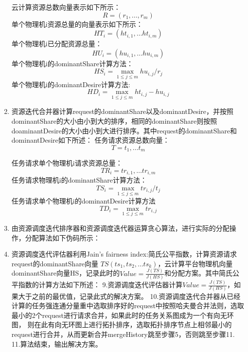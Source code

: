 \begin{enumerate}
云计算资源总数向量表示如下所示：
\begin{equation}
R=\left({r}_{1},…,{r}_{m}\right)
\end{equation}
单个物理机i资源总量的向量表示如下所示：
\begin{equation}
{HT}_{i}=\left({ht}_{i,1},…{ht}_{i,m} \right)
\end{equation}
单个物理机i已分配资源总量：
\begin{equation}
{HU}_{i}=\left({hu}_{i,1},…{hu}_{i,m}\right)
\end{equation}
单个物理机i的dominantShare计算方法：
\begin{equation}
{HS}_{i} = \max \limits_{1 \leq j \leq m} {hu}_{i,j}/{{r}_{j}} 
\end{equation}
单个物理机i的dominantDesire计算方法:
\begin{equation}
{HD}_{i}=\max \limits_{1 \leq j \leq m } {ht}_{i,j}-{hu}_{i,j} 
\end{equation}
\item 资源迭代合并器计算request的dominantShare以及dominantDesire，并按照dominantShare的大小由小到大的排序，相同的dominantShare则按照doaminantDesire的大小由小到大进行排序。其中request的dominantShare和dominantDesire如下所述：
任务请求资源总数向量：
\begin{equation}
T={t}_{1},…{t}_{m}
\end{equation}

任务请求单个物理机i请求资源总量：
\begin{equation}
{TR}_{i}={tr}_{i,1},…{tr}_{i,m}
\end{equation}
任务请求物理机i的dominantShare计算方法：
\begin{equation}
{TS}_{i}=\max \limits_{1 \leq j \leq m} {{tr}_{i,j}}/{{t}_{j}}
\end{equation}
任务请求单个物理机i的dominantDesire计算方法
\begin{equation}
{TD}_{i}=\max \limits_{1 \leq j \leq m} {tr}_{i,j}
\end{equation}

\item 由资源调度迭代排序器和资源调度迭代器运算贪心算法，进行实际的分配操作，分配算法如下伪码所示：
\item 资源调度迭代评估器利用Jain’s fairness index:简氏公平指数，计算资源请求request的dominantShare向量
$TS\left({ts}_{1},{ts}_{2},…{ts}_{k}\right )$，云计算平台物理机向量dominantShare向量HS，记录此时的$Value = \frac{J(TS)}{J(HS)}$和分配方案。其中简氏公平指数的计算方法如下所述：
9.资源调度迭代评估器计算$Value = \frac{J(TS)}{J(HS)}$，如果大于之前的最优值，记录此式的解决方案。
10.资源调度迭代合并器从已经计算的任务强连通分量重中选取排序好的request中按照哈夫曼合并法则，选取最小的2个request进行请求合并，如果此时的任务关系图成为一个有向无环图，
则在此有向无环图上进行拓扑排序，选取拓扑排序节点上相邻最小的request进行合并，从而更新合并mergeHistory跳至步骤5，否则跳至步骤11.
11.算法结束，输出解决方案。
\end{enumerate}
